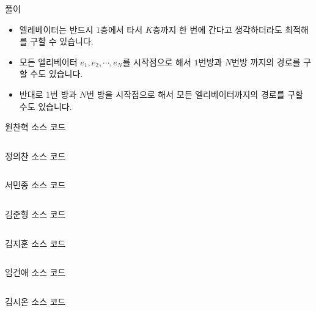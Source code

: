 \begin{frame}{풀이}
\footnotesize

\begin{itemize}
  \item 엘레베이터는 반드시 $1$층에서 타서 $K$층까지 한 번에 간다고 생각하더라도 최적해를 구할 수 있습니다.
  \item 모든 엘리베이터 $e_1, e_2, \cdots, e_N$를 시작점으로 해서 $1$번방과 $N$번방 까지의 경로를 구할 수도 있습니다.
  \item 반대로 $1$번 방과 $N$번 방을 시작점으로 해서 모든 엘리베이터까지의 경로를 구할 수도 있습니다.
\end{itemize}

\end{frame}

\begin{frame}{원찬혁 소스 코드}
\inputminted{java}{../src/\prob/chanhyeok/Main.java}
\end{frame}

\begin{frame}{정의찬 소스 코드}
\inputminted{java}{../src/\prob/uichan/Main.java}
\end{frame}

\begin{frame}{서민종 소스 코드}
\inputminted{java}{../src/\prob/minjong/Main.java}
\end{frame}

\begin{frame}{김준형 소스 코드}
\inputminted{java}{../src/\prob/junhyeong/Main.java}
\end{frame}

\begin{frame}{김지훈 소스 코드}
\inputminted{java}{../src/\prob/jihoon/BOJ_30985.java}
\end{frame}

\begin{frame}{임건애 소스 코드}
\inputminted{java}{../src/\prob/keonae/Main.java}
\end{frame}

\begin{frame}{김시온 소스 코드}
\inputminted{java}{../src/\prob/sion/Main.java}
\end{frame}
